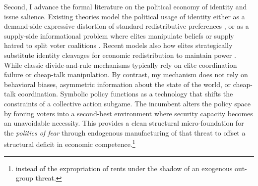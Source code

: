 \documentclass[11pt,twoside]{extarticle}
\begin{document}




Second, I advance the formal literature on the political economy of identity and issue salience. Existing theories model the political usage of identity either as a demand-side expressive distortion of standard redistributive preferences \citep{shayoModelSocialIdentity2009, besleyRiseIdentityPolitics2019, gennaioliIdentityPolitics2023}, or as a supply-side informational problem where elites manipulate beliefs or supply hatred to split voter coalitions \citep*{glaeserPoliticalEconomyHatred2005, baligaStrategyManipulatingConflict2012, izzoIdeologicalCompetition2023, callanderCauseEffectPolitical2022}.
Recent models also how elites strategically substitute identity cleavages for economic redistribution to maintain power \citep*{acemogluKleptocracyDivideandRuleModel2004,padróimiquelControlPoliticiansDivided2007,mukandPoliticalEconomyLiberal2020}. While classic divide-and-rule mechanisms typically rely on elite coordination failure or cheap-talk manipulation. 
By contrast, my mechanism does not rely on behavioral biases, asymmetric information about the state of the world, or cheap-talk coordination. Symbolic policy functions as a technology that shifts the constraints of a collective action subgame. The incumbent alters the policy space by forcing voters into a second-best environment where security capacity becomes an unavoidable necessity. This provides a clean structural micro-foundation for the \emph{politics of fear} through endogenous manufacturing of that threat to offset a structural deficit in economic competence.\footnote{instead of the expropriation of rents under the shadow of an exogenous out-group threat.}
\end{document}

